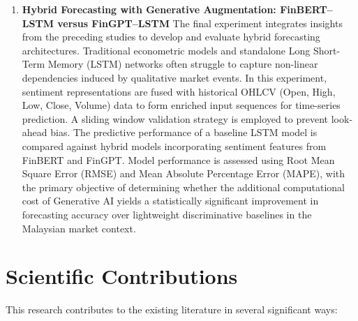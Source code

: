 \documentclass[singlespace]{ucetd}
\begin{document}
\begin{enumerate}
    \item \textbf{Hybrid Forecasting with Generative Augmentation: FinBERT--LSTM versus FinGPT--LSTM}  
    The final experiment integrates insights from the preceding studies to develop and evaluate hybrid forecasting architectures. Traditional econometric models and standalone Long Short-Term Memory (LSTM) networks often struggle to capture non-linear dependencies induced by qualitative market events. In this experiment, sentiment representations are fused with historical OHLCV (Open, High, Low, Close, Volume) data to form enriched input sequences for time-series prediction. A sliding window validation strategy is employed to prevent look-ahead bias. The predictive performance of a baseline LSTM model is compared against hybrid models incorporating sentiment features from FinBERT and FinGPT. Model performance is assessed using Root Mean Square Error (RMSE) and Mean Absolute Percentage Error (MAPE), with the primary objective of determining whether the additional computational cost of Generative AI yields a statistically significant improvement in forecasting accuracy over lightweight discriminative baselines in the Malaysian market context.
\end{enumerate}


\section{Scientific Contributions}


This research contributes to the existing literature in several significant ways:
\end{document}
